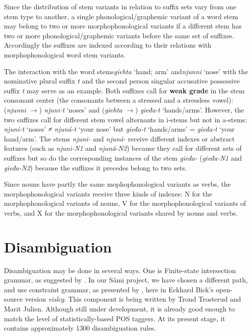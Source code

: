 \documentclass[a4paper,english]{article}
\begin{document}
Since the distribution of stem variants in relation to suffix sets vary from one stem type to another, a single phonological/graphemic variant of a word stem may belong to two or more morphophonological variants if a different stem has two or more phonological/graphemic variants before the same set of suffixes. Accordingly the suffixes are indexed according to their relations with morphophonological word stem variants. 

The interaction with the word stems\textit{giehta} ‘hand; arm’ and\textit{njunni} ‘nose’ with the nominative plural suffix \textit{­t} and the second person singular accusative possessive suffix \textit{­t} may serve as an example. Both suffixes call for \textbf{weak grade} in the stem consonant center (the consonants between a stressed and a stressless vowel): (\textit{njunni $\rightarrow$}) \textit{njuni-t} ‘noses’ and (\textit{giehta} $\rightarrow$)\textit{ gieđa-t} ‘hands/arms’. However, the two suffixes call for different stem vowel alternants in i-stems but not in a-stems: \textit{njuni-t} ‘noses’ ≠ \textit{njuná-t} ‘your nose’ but \textit{gieđa-t} ‘hands/arms’ = \textit{gieđa-t} ‘your hand/arm’. The stems \textit{njuni-} and \textit{njuná-} receive different indexes or abstract features (such as \textit{njuni-N1} and \textit{njuná-N2}) because they call for different sets of suffixes but so do the corresponding instances of the stem \textit{gieđa-} (\textit{gieđa-N1} and \textit{gieđa-N2}) because the suffixes it precedes belong to two sets. 

Since nouns have partly the same mophophonological variants as verbs, the morphophonological variants receive three kinds of indexes: N for the morphophonological variants of nouns, V for the morphophonological variants of verbs, and X for the morphophonological variants shared by nouns and verbs.

\section{Disambiguation}\label{disamb}

Disambiguation may be done in several ways. One is Finite-state intersection grammar, as suggested by \cite{Koskenniemi97}. In our Sámi project, we have chosen a different path, and use constraint grammar, as presented by \cite{Tapanainen96}, here in Eckhard Bick's open-source version \textit{vislcg}. This component is being written by Trond Trosterud and Marit Julien. Although still under development, it is already good enough to match the level of statistically-based POS taggers. At its present stage, it contains approximately 1300 disambiguation rules.
\end{document}

